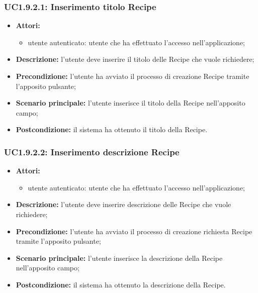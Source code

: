 \subsubsection{UC1.9.2.1: Inserimento titolo Recipe}
\begin{itemize}
	\item \textbf{Attori:}
	\begin{itemize}
		\item utente autenticato: utente che ha effettuato l'accesso nell'applicazione;
	\end{itemize}
	\item \textbf{Descrizione:} l'utente deve inserire il titolo delle Recipe che vuole richiedere;
	\item \textbf{Precondizione:} l'utente ha avviato il processo di creazione Recipe tramite l'apposito pulsante;
	\item \textbf{Scenario principale:} l'utente inserisce il titolo della Recipe nell'apposito campo;
	\item \textbf{Postcondizione:} il sistema ha ottenuto il titolo della Recipe.
\end{itemize}

\subsubsection{UC1.9.2.2: Inserimento descrizione Recipe}
\begin{itemize}
	\item \textbf{Attori:}
	\begin{itemize}
		\item utente autenticato: utente che ha effettuato l'accesso nell'applicazione;
	\end{itemize}
	\item \textbf{Descrizione:} l'utente deve inserire descrizione delle Recipe che vuole richiedere;
	\item \textbf{Precondizione:} l'utente ha avviato il processo di creazione richiesta Recipe tramite l'apposito pulsante;
	\item \textbf{Scenario principale:} l'utente inserisce la descrizione della Recipe nell'apposito campo;
	\item \textbf{Postcondizione:} il sistema ha ottenuto la descrizione della Recipe.
\end{itemize}

